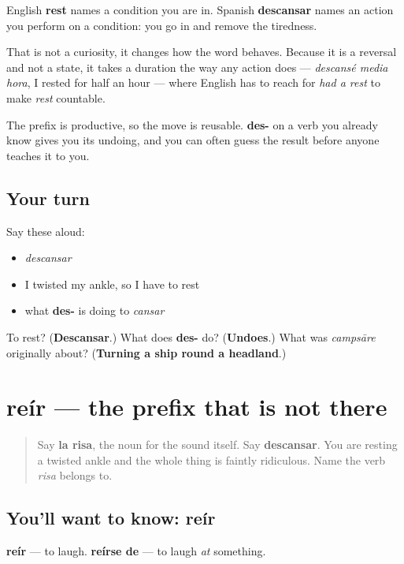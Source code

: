 \begin{culture}
English \textbf{rest} names a condition you are in. Spanish \textbf{descansar} names an action you perform on a condition: you go in and remove the tiredness.

That is not a curiosity, it changes how the word behaves. Because it is a reversal and not a state, it takes a duration the way any action does — \emph{descansé media hora}, I rested for half an hour — where English has to reach for \emph{had a rest} to make \emph{rest} countable.

The prefix is productive, so the move is reusable. \textbf{des-} on a verb you already know gives you its undoing, and you can often guess the result before anyone teaches it to you.
\end{culture}

\subsection*{Your turn}
Say these aloud:

\begin{itemize}
\raggedright
  \item \emph{descansar}
  \item I twisted my ankle, so I have to rest
  \item what \textbf{des-} is doing to \emph{cansar}
\end{itemize}

\begin{tcolorbox}[breakable,colback=teal!4,colframe=teal!35!black,title={Before you move on}]
To rest? (\textbf{Descansar}.) What does \textbf{des-} do? (\textbf{Undoes}.) What was \emph{campsāre} originally about? (\textbf{Turning a ship round a headland}.)
\end{tcolorbox}
\section[reír]{reír — the prefix that is not there}

\label{lesson:ES-C438-reir}



\begin{quote}
Say \textbf{la risa}, the noun for the sound itself. Say \textbf{descansar}. You are resting a twisted ankle and the whole thing is faintly ridiculous. Name the verb \emph{risa} belongs to.
\end{quote}

\subsection*{You'll want to know: reír}
\textbf{reír} — to laugh. \textbf{reírse de} — to laugh \emph{at} something.

